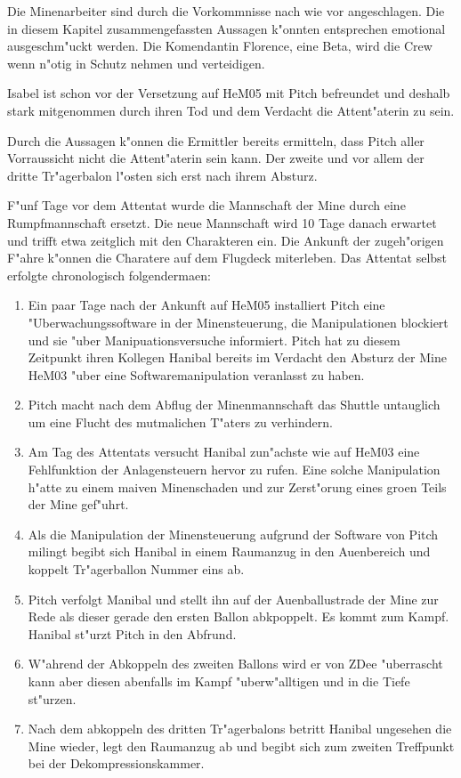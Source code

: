 \begin{remarks}
	Die Minenarbeiter sind durch die Vorkommnisse nach wie vor angeschlagen. Die in diesem Kapitel zusammengefassten Aussagen k"onnten entsprechen emotional ausgeschm"uckt werden. Die Komendantin Florence, eine Beta, wird die Crew wenn n"otig in Schutz nehmen und verteidigen.

	Isabel ist schon vor der Versetzung auf HeM05 mit Pitch befreundet und deshalb stark mitgenommen durch ihren Tod und dem Verdacht die Attent"aterin zu sein.

	Durch die Aussagen k"onnen die Ermittler bereits ermitteln, dass Pitch aller Vorraussicht nicht die Attent"aterin sein kann. Der zweite und vor allem der dritte Tr"agerbalon l"osten sich erst nach ihrem Absturz.		
\end{remarks}


F"unf Tage vor dem Attentat wurde die Mannschaft der Mine durch eine Rumpfmannschaft ersetzt. Die neue Mannschaft wird 10 Tage danach erwartet und trifft etwa zeitglich mit den Charakteren ein. Die Ankunft der zugeh"origen F"ahre k"onnen die Charatere auf dem Flugdeck miterleben. Das Attentat selbst erfolgte chronologisch folgenderma\3en:

\begin{enumerate}
	\item Ein paar Tage nach der Ankunft auf HeM05 installiert Pitch eine "Uberwachungssoftware in der Minensteuerung, die Manipulationen 	
		blockiert und sie "uber Manipuationsversuche informiert. Pitch hat zu diesem Zeitpunkt ihren Kollegen Hanibal bereits im Verdacht den Absturz der Mine HeM03 "uber eine Softwaremanipulation veranlasst zu haben.
	\item Pitch macht nach dem Abflug der Minenmannschaft das Shuttle untauglich um eine Flucht des mutma\3lichen T"aters zu verhindern.
	\item Am Tag des Attentats versucht Hanibal zun"achste wie auf HeM03 eine Fehlfunktion der Anlagensteuern hervor zu rufen. Eine solche 
		Manipulation h"atte zu einem ma\3iven Minenschaden und zur Zerst"orung eines gro\3en Teils der Mine gef"uhrt.
	\item Als die Manipulation der Minensteuerung aufgrund der Software von Pitch mi\3lingt begibt sich Hanibal in einem Raumanzug in den 
		Au\3enbereich und koppelt Tr"agerballon Nummer eins ab.
	\item Pitch verfolgt Manibal und stellt ihn auf der Au\3enballustrade der Mine zur Rede als dieser gerade den ersten Ballon abkpoppelt. 
		Es kommt zum Kampf. Hanibal st"urzt Pitch in den Abfrund.
	\item W"ahrend der Abkoppeln des zweiten Ballons wird er von ZDee "uberrascht kann aber diesen abenfalls im Kampf "uberw"alltigen und 
		in die Tiefe st"urzen.
	\item Nach dem abkoppeln des dritten Tr"agerbalons betritt Hanibal  ungesehen die Mine wieder, legt den Raumanzug ab und begibt sich 
		zum zweiten Treffpunkt bei der Dekompressionskammer.
\end{enumerate}


